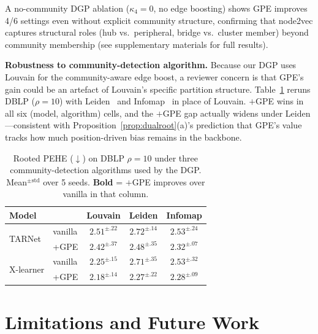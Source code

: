 \documentclass[sigconf,anonymous,review]{acmart}
\begin{document}
A no-community DGP ablation ($\kappa_4{=}0$, no edge boosting) shows GPE improves 4/6 settings even without explicit community structure, confirming that node2vec captures structural roles (hub vs.\ peripheral, bridge vs.\ cluster member) beyond community membership (see supplementary materials for full results).

\textbf{Robustness to community-detection algorithm.} Because our DGP uses Louvain for the community-aware edge boost, a reviewer concern is that GPE's gain could be an artefact of Louvain's specific partition structure. Table~\ref{tab:comm_sens} reruns DBLP ($\rho{=}10$) with Leiden~\cite{traag2019leiden} and Infomap~\cite{rosvall2008infomap} in place of Louvain. $+$GPE wins in all six (model, algorithm) cells, and the $+$GPE gap actually widens under Leiden---consistent with Proposition~\ref{prop:dualroot}(a)'s prediction that GPE's value tracks how much position-driven bias remains in the backbone.

\begin{table}[t]
\caption{Rooted PEHE ($\downarrow$) on DBLP $\rho{=}10$ under three community-detection algorithms used by the DGP. Mean$^{\pm\text{std}}$ over 5 seeds. \textbf{Bold} = $+$GPE improves over vanilla in that column.}
\label{tab:comm_sens}
\centering
\footnotesize
\setlength{\tabcolsep}{4pt}
\begin{tabular}{@{}l l ccc@{}}
\toprule
Model & & Louvain & Leiden & Infomap \\
\midrule
\multirow{2}{*}{TARNet}    & vanilla & $2.51^{\pm.22}$          & $2.72^{\pm.14}$          & $2.53^{\pm.24}$ \\
                           & +GPE    & $\mathbf{2.42}^{\pm.37}$ & $\mathbf{2.48}^{\pm.35}$ & $\mathbf{2.32}^{\pm.07}$ \\
\multirow{2}{*}{X-learner} & vanilla & $2.25^{\pm.15}$          & $2.71^{\pm.35}$          & $2.53^{\pm.32}$ \\
                           & +GPE    & $\mathbf{2.18}^{\pm.14}$ & $\mathbf{2.27}^{\pm.22}$ & $\mathbf{2.28}^{\pm.09}$ \\
\bottomrule
\end{tabular}
\end{table}

\section{Limitations and Future Work}\label{sec:limit}
\end{document}
